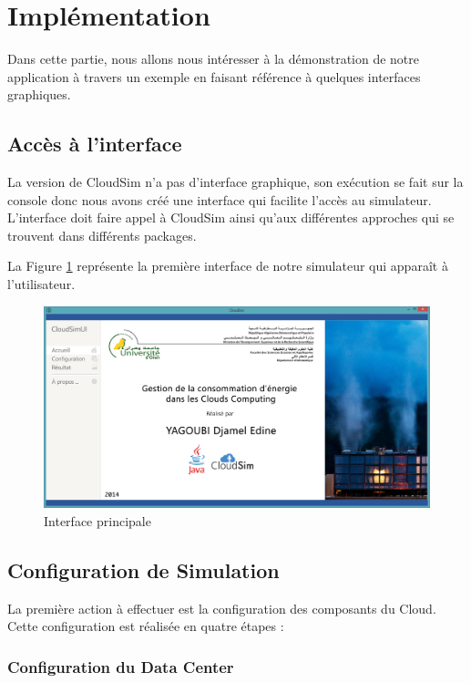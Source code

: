 \section{Implémentation}
\begin{onehalfspace}
Dans cette partie, nous allons nous intéresser à la démonstration de notre application à travers un exemple en faisant référence à quelques interfaces graphiques.
\subsection{Accès à l’interface}
La version de CloudSim n’a pas d’interface graphique, son exécution se fait sur la console donc nous avons créé une interface qui facilite l’accès au simulateur. L’interface doit faire appel à CloudSim ainsi qu’aux différentes approches qui se trouvent dans différents packages.\medskip

La Figure \ref{InterfacePrincipale} représente la première interface de notre simulateur qui apparaît à l'utilisateur. 

\begin{figure}[!h]
\begin{center}
\includegraphics[scale=0.4]{figures/inf1.png} 
\end{center}
\caption{Interface principale}
\label{InterfacePrincipale}
\end{figure}

\subsection{Configuration de Simulation}
La première action à effectuer est la configuration des composants du Cloud. Cette configuration est réalisée en quatre étapes :
\subsubsection{Configuration du Data Center}


\end{onehalfspace}
